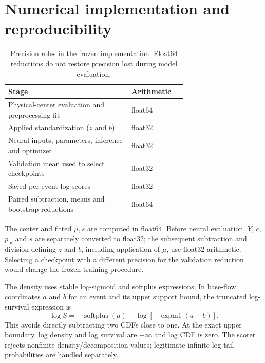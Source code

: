 \documentclass[11pt]{article}
\newcommand{\pin}{p_{\mathrm{in}}}
\begin{document}

\clearpage
\section{Numerical implementation and reproducibility}
\label{sec:numerical_boundary}


\begin{table}[!htbp]
\centering
\caption{Precision roles in the frozen implementation. Float64 reductions
do not restore precision lost during model evaluation.}
\begin{tabular}{p{0.69\linewidth}l}
\toprule Stage & Arithmetic \\
\midrule
Physical-center evaluation and preprocessing fit & float64 \\
Applied standardization ($z$ and $b$) & float32 \\
Neural inputs, parameters, inference and optimizer & float32 \\
Validation mean used to select checkpoints & float32 \\
Saved per-event log scores & float32 \\
Paired subtraction, means and bootstrap reductions & float64 \\
\bottomrule
\end{tabular}
\end{table}
The center and fitted $\mu,s$ are computed in float64. Before neural
evaluation, $Y$, $c$, $\pin$ and $s$ are separately converted to float32;
the subsequent subtraction and division defining $z$ and $b$, including
application of $\mu$, use float32 arithmetic. Selecting a checkpoint with
a different precision for the validation reduction would change the frozen
training procedure.

The density uses stable log-sigmoid and softplus expressions. In base-flow
coordinates $a$ and $b$ for an event and its upper support bound, the truncated
log-survival expression is
\begin{equation}
 \log S=-\operatorname{softplus}(a)+\log[-\operatorname{expm1}(a-b)].
\end{equation}
This avoids directly subtracting two CDFs close to one. At the exact upper
boundary, log density and log survival are $-\infty$ and log CDF is zero.
The scorer rejects nonfinite density/decomposition values; legitimate
infinite log-tail probabilities are handled separately.
\end{document}
